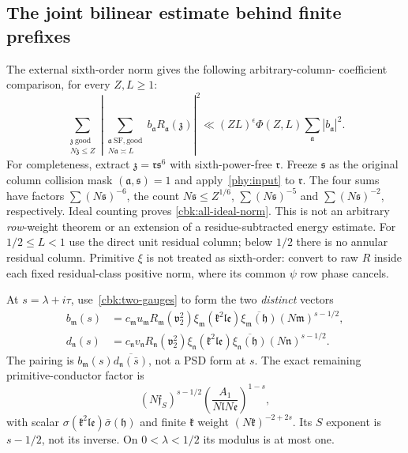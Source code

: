 \subsection{The joint bilinear estimate behind finite prefixes}
\label{cbk:prefix-proof}
The external sixth-order norm gives the following arbitrary-column-
coefficient comparison, for every $Z,L\ge1$:
\begin{equation}\label{cbk:all-ideal-norm}
 \sum_{\substack{\mathfrak z\ \mathrm{good}\\N\mathfrak z\le Z}}
    \left|\sum_{\substack{\mathfrak a\ \mathrm{SF,good}\\N\mathfrak a\asymp L}}
                      b_{\mathfrak a}R_{\mathfrak a}(\mathfrak z)\right|^2
       \ll (ZL)^\epsilon\Phi(Z,L)\sum_{\mathfrak a}|b_{\mathfrak a}|^2.
\end{equation}
For completeness, extract $\mathfrak z=\mathfrak r\mathfrak s^6$
with sixth-power-free $\mathfrak r$. Freeze $\mathfrak s$ as the
original column collision mask $(\mathfrak a,\mathfrak s)=1$ and
apply~\eqref{phy:input} to $\mathfrak r$. The four sums have factors
$\sum(N\mathfrak s)^{-6}$, the count
$N\mathfrak s\le Z^{1/6}$, $\sum(N\mathfrak s)^{-5}$ and
$\sum(N\mathfrak s)^{-2}$, respectively. Ideal counting proves
\eqref{cbk:all-ideal-norm}. This is not an arbitrary \emph{row}-weight
theorem or an extension of a residue-subtracted energy estimate.
For $1/2\le L<1$ use the direct unit residual column; below $1/2$
there is no annular residual column. Primitive $\xi$ is not treated
as sixth-order: convert to raw $R$ inside each fixed residual-class
positive norm, where its common $\psi$ row phase cancels.

At $s=\lambda+i\tau$, use~\eqref{cbk:two-gauges} to form the two
\emph{distinct} vectors
\begin{equation}\label{cbk:Mellin-vectors}
 \begin{aligned}
 b_{\mathfrak m}(s)&=c_{\mathfrak m}u_{\mathfrak m}
  R_{\mathfrak m}(\mathfrak v_2^2)
  \xi_{\mathfrak m}(\mathfrak k^2\mathfrak l\mathfrak e)
  \overline{\xi_{\mathfrak m}(\mathfrak h)}(N\mathfrak m)^{s-1/2},\\
 d_{\mathfrak n}(s)&=c_{\mathfrak n}v_{\mathfrak n}
  R_{\mathfrak n}(\mathfrak v_2^2)
  \xi_{\mathfrak n}(\mathfrak k^2\mathfrak l\mathfrak e)
  \overline{\xi_{\mathfrak n}(\mathfrak h)}(N\mathfrak n)^{s-1/2}.
 \end{aligned}
\end{equation}
The pairing is $b_{\mathfrak m}(s)
\overline{d_{\mathfrak n}(\bar s)}$, not a PSD form at $s$.
The exact remaining primitive-conductor factor is
\begin{equation}\label{cbk:FS-Mellin}
 (N\mathfrak f_S)^{s-1/2}
       \left(\frac{A_1}{N\mathfrak l N\mathfrak e}\right)^{1-s},
\end{equation}
with scalar $\sigma(\mathfrak k^2\mathfrak l\mathfrak e)
\bar\sigma(\mathfrak h)$ and finite $\mathfrak k$ weight
$(N\mathfrak k)^{-2+2s}$. Its $S$ exponent is $s-1/2$, not its
inverse. On $0<\lambda<1/2$ its modulus is at most one.

